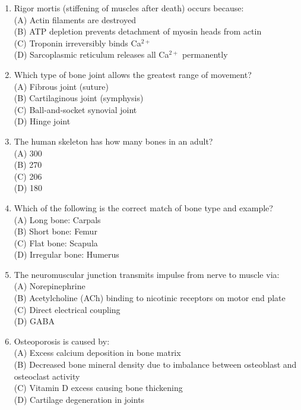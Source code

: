 \documentclass{article}
\begin{document}
\begin{enumerate}[label=Q\arabic*.]
\item Rigor mortis (stiffening of muscles after death) occurs because:
\\(A) Actin filaments are destroyed
\\(B) ATP depletion prevents detachment of myosin heads from actin
\\(C) Troponin irreversibly binds Ca$^{2+}$
\\(D) Sarcoplasmic reticulum releases all Ca$^{2+}$ permanently

\item Which type of bone joint allows the greatest range of movement?
\\(A) Fibrous joint (suture)
\\(B) Cartilaginous joint (symphysis)
\\(C) Ball-and-socket synovial joint
\\(D) Hinge joint

\item The human skeleton has how many bones in an adult?
\\(A) 300
\\(B) 270
\\(C) 206
\\(D) 180

\item Which of the following is the correct match of bone type and example?
\\(A) Long bone: Carpals
\\(B) Short bone: Femur
\\(C) Flat bone: Scapula
\\(D) Irregular bone: Humerus

\item The neuromuscular junction transmits impulse from nerve to muscle via:
\\(A) Norepinephrine
\\(B) Acetylcholine (ACh) binding to nicotinic receptors on motor end plate
\\(C) Direct electrical coupling
\\(D) GABA

\item Osteoporosis is caused by:
\\(A) Excess calcium deposition in bone matrix
\\(B) Decreased bone mineral density due to imbalance between osteoblast and osteoclast activity
\\(C) Vitamin D excess causing bone thickening
\\(D) Cartilage degeneration in joints


\end{enumerate}
\end{document}
